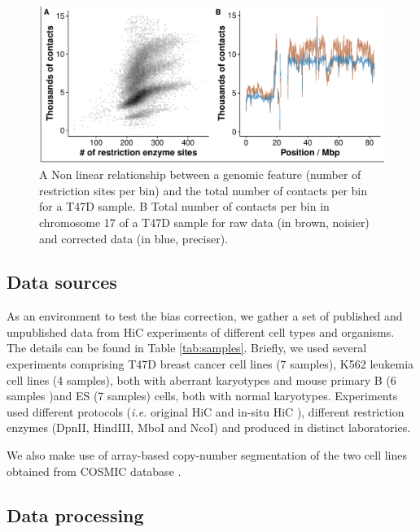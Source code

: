\documentclass{bioinfo}
\begin{document}
\begin{methods}
\begin{figure}[!tpb]
	\centerline{\includegraphics[width=.45\textwidth]{img/figure1.pdf}}
	\caption{
		A Non linear relationship between a genomic feature (number of restriction sites per bin) and the total number of contacts per bin for a T47D sample. B Total number of contacts per bin in chromosome 17 of a T47D sample for raw data (in brown, noisier) and corrected data (in blue, preciser).
	}\label{fig:totals}
\end{figure}

\subsection{Data sources}

As an environment to test the bias correction, we gather a set of published \citep{ledily2014distinct,encode2012integrated,rao20143d,stadhouders2017transcription,lin2012global,dixon2012topological} and unpublished data from HiC experiments of different cell types and organisms. The details can be found in Table \ref{tab:samples}. Briefly, we used several experiments comprising T47D breast cancer cell lines (7 samples), K562 leukemia cell lines (4 samples), both with aberrant karyotypes and mouse primary B (6 samples )and ES (7 samples) cells, both with normal karyotypes. Experiments used different protocols (\textit{i.e.} original HiC \citep{lieberman2009comprehensive} and in-situ HiC \citep{rao20143d}), different restriction enzymes (DpnII, HindIII, MboI and NcoI) and produced in distinct laboratories.

We also make use of array-based copy-number segmentation of the two cell lines obtained from COSMIC database \citep{forbes2010cosmic}.

\subsection{Data processing}


\end{methods}
\end{document}
